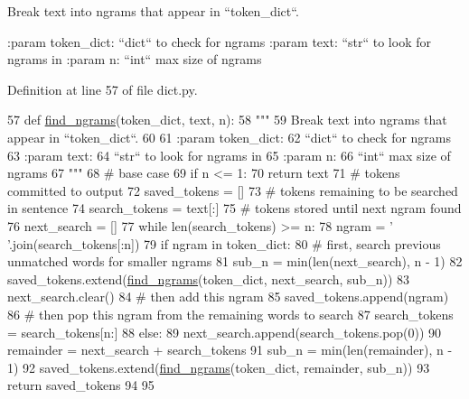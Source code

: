 \begin{DoxyVerb}Break text into ngrams that appear in ``token_dict``.

:param token_dict:
    ``dict`` to check for ngrams
:param text:
    ``str`` to look for ngrams in
:param n:
    ``int`` max size of ngrams
\end{DoxyVerb}
 

Definition at line 57 of file dict.\+py.


\begin{DoxyCode}
57 \textcolor{keyword}{def }\hyperlink{namespaceparlai_1_1core_1_1dict_a5e9eb43b6c0dce0b3aab7f3ea3717de6}{find\_ngrams}(token\_dict, text, n):
58     \textcolor{stringliteral}{"""}
59 \textcolor{stringliteral}{    Break text into ngrams that appear in ``token\_dict``.}
60 \textcolor{stringliteral}{}
61 \textcolor{stringliteral}{    :param token\_dict:}
62 \textcolor{stringliteral}{        ``dict`` to check for ngrams}
63 \textcolor{stringliteral}{    :param text:}
64 \textcolor{stringliteral}{        ``str`` to look for ngrams in}
65 \textcolor{stringliteral}{    :param n:}
66 \textcolor{stringliteral}{        ``int`` max size of ngrams}
67 \textcolor{stringliteral}{    """}
68     \textcolor{comment}{# base case}
69     \textcolor{keywordflow}{if} n <= 1:
70         \textcolor{keywordflow}{return} text
71     \textcolor{comment}{# tokens committed to output}
72     saved\_tokens = []
73     \textcolor{comment}{# tokens remaining to be searched in sentence}
74     search\_tokens = text[:]
75     \textcolor{comment}{# tokens stored until next ngram found}
76     next\_search = []
77     \textcolor{keywordflow}{while} len(search\_tokens) >= n:
78         ngram = \textcolor{stringliteral}{' '}.join(search\_tokens[:n])
79         \textcolor{keywordflow}{if} ngram \textcolor{keywordflow}{in} token\_dict:
80             \textcolor{comment}{# first, search previous unmatched words for smaller ngrams}
81             sub\_n = min(len(next\_search), n - 1)
82             saved\_tokens.extend(\hyperlink{namespaceparlai_1_1core_1_1dict_a5e9eb43b6c0dce0b3aab7f3ea3717de6}{find\_ngrams}(token\_dict, next\_search, sub\_n))
83             next\_search.clear()
84             \textcolor{comment}{# then add this ngram}
85             saved\_tokens.append(ngram)
86             \textcolor{comment}{# then pop this ngram from the remaining words to search}
87             search\_tokens = search\_tokens[n:]
88         \textcolor{keywordflow}{else}:
89             next\_search.append(search\_tokens.pop(0))
90     remainder = next\_search + search\_tokens
91     sub\_n = min(len(remainder), n - 1)
92     saved\_tokens.extend(\hyperlink{namespaceparlai_1_1core_1_1dict_a5e9eb43b6c0dce0b3aab7f3ea3717de6}{find\_ngrams}(token\_dict, remainder, sub\_n))
93     \textcolor{keywordflow}{return} saved\_tokens
94 
95 
\end{DoxyCode}
\mbox{\label{namespaceparlai_1_1core_1_1dict_a4d8952ff127b540967c707a58e8ebb48}} 

